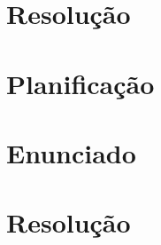 \documentclass[11pt,a4paper]{report}
\begin{document}
\chapter{Resolução}






\chapter{Planificação}




\chapter{Enunciado}




\chapter{Resolução}




\end{document}
